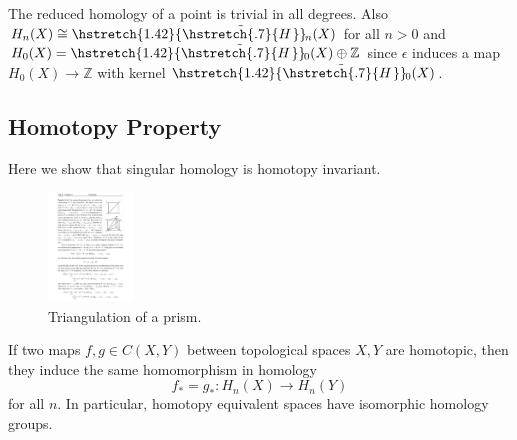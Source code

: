 \documentclass[english,letterpaper]{article}%
\numberwithin{equation}{section}
\numberwithin{figure}{section}
\numberwithin{table}{section}
\theoremstyle{definition}
\theoremstyle{definition}
\theoremstyle{definition}
\theoremstyle{plain}
\theoremstyle{plain}
\theoremstyle{plain}
\theoremstyle{plain}
\theoremstyle{remark}
\theoremstyle{remark}
\newcommand{\bbZ}{\mathbb{Z}}
\newcommand\wt[1]{\hstretch{1.42}{\tilde{\hstretch{.7}{#1\mkern2mu}}}\mkern-2mu}
\begin{document}
The reduced homology of a point is trivial in all degrees. Also $H_n(X)\cong \wt{H}_n(X)$ for all $n>0$ and $H_0(X)=\wt{H}_0(X)\oplus \bbZ$ since $\epsilon$ induces a map $H_0(X)\to \bbZ$ with kernel $\wt{H}_0(X)$.




\subsection{Homotopy Property}

Here we show that singular homology is homotopy invariant.

\begin{figure}
    \begin{center}
        \includegraphics[width=0.2\textwidth]{Images/prism.pdf}
    \end{center}
    \caption{Triangulation of a prism.\label{Prism fig}}
\end{figure}

\begin{prop}
    If two maps $f,g\in C(X,Y)$ between topological spaces $X,Y$ are homotopic, then they induce the same homomorphism in homology
    \[f_\ast=g_\ast :H_n(X)\to H_n(Y)\]
    for all $n$. In particular, homotopy equivalent spaces have isomorphic homology groups.
\end{prop}
\end{document}
